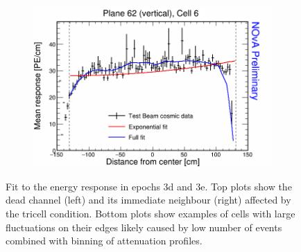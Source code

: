 \begin{figure}[h]
\begin{subfigure}{0.495\textwidth}
  \end{subfigure}
  \begin{subfigure}{0.495\textwidth}
    \includegraphics[width=\linewidth]{Plots/RelativeCalibrationResults/ep3de_062_006.png}
  \end{subfigure}  
  \caption[Attenuation fits for dead channels in period 3 data]{Fit to the energy response in epochs 3d and 3e. Top plots show the dead channel (left) and its immediate neighbour (right) affected by the tricell condition. Bottom plots show examples of cells with large fluctuations on their edges likely caused by low number of events combined with binning of attenuation profiles.}
  \label{fig:AttenfitResultsEpoch3de_LeftoverUnderfilledCell}
\end{figure}

